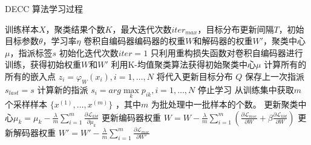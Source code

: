 \begin{algorithm}[H]
	\caption{DECC 算法学习过程}
	\begin{algorithmic}[1] %
		\Require 训练样本$X$，聚类结果个数$K$，最大迭代次数$iter_{max}$，目标分布更新间隔$T$，初始目标参数$\theta$，学习率$\eta$
		\Ensure 卷积自编码器编码器的权重$W$和解码器的权重$W'$，聚类中心$\mu$，指派标签$s$
		\State 初始化迭代次数$iter=1$
		\State 只利用重构损失函数对卷积自编码器进行训练，获得初始权重$W$和$W'$
		\State 利用K-均值聚类算法获得初始聚类中心$\mu$
				\State 计算所有的所有的嵌入点 $z_i=\varphi_W(x_i),i=1,\dots,N$
				\State 将代入更新目标分布 $Q$
				\State 保存上一次指派$s_{last}=s$
				\State 计算新的指派 $s_i=arg \max \limits_k p_{ik}, i= 1,\dots,N$
					\State 停止学习
				\EndIf
			\EndIf
			\State 从训练集中获取$m$ 个采样样本 $\{x^{(1)},\dots,x^{(m)}\}$ ，其中$m$ 为批处理中一批样本的个数。
			\State 更新聚类中心$\mu_k=\mu_k-\frac{\lambda}{m}\sum_{i=1}^m{\frac{\partial \mathscr{L}_{kld}}{\partial \mu_k}}$
			\State 更新编码器权重 $W=W-\frac{\lambda}{m}\sum_{i=1}^m(\frac{\partial \mathscr{L}_{mse}}{\partial W} + \beta \frac{\partial \mathscr{L}_{kld}}{\partial W})$
			\State 更新解码器权重 $W'=W'-\frac{\lambda}{m}\sum_{i=1}^m{\frac{\partial \mathscr{L}_{mse}}{\partial W'}}$
		\EndWhile
	\end{algorithmic}
\end{algorithm}


